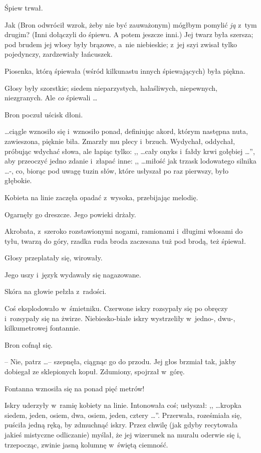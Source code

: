 \documentclass[oneside,polish,11pt,rmheadings]{mwbk}
\begin{document}
Śpiew trwał. 

Jak (Bron odwrócił wzrok, żeby nie być zauważonym) mógłbym pomylić \textit{ją } z~tym drugim? (Inni dołączyli do śpiewu. A potem jeszcze inni.) Jej twarz była szersza; pod brudem jej włosy były brązowe, a~nie niebieskie; z~jej szyi zwisał tylko pojedynczy, zardzewiały łańcuszek. 

Piosenka, którą śpiewała (wśród kilkunastu innych śpiewających) była piękna. 

Głosy były szorstkie; siedem nieparzystych, hałaśliwych, niepewnych, niezgranych. Ale \textit{co } śpiewali \ldots  

Bron poczuł uścisk dłoni. 

 \ldots  ciągle wznosiło się i~wznosiło ponad, definiując akord, którym następna nuta, zawieszona, pięknie biła. Zmarzły mu plecy i~brzuch. Wydychał, oddychał, próbując wdychać słowa, ale łapiąc tylko: ,, \ldots  cały onyks i~fałdy krwi gołębiej \ldots '', aby przeoczyć jedno zdanie i~złapać inne: ,, \ldots  miłość jak trzask lodowatego silnika  \ldots -, co, biorąc pod uwagę tuzin słów, które usłyszał po raz pierwszy, było głębokie. 

Kobieta na linie zaczęła opadać z~wysoka, przebijając melodię. 

Ogarnęły go dreszcze. Jego powieki drżały. 

Akrobata, z~szeroko rozstawionymi nogami, ramionami i~długimi włosami do tyłu, twarzą do góry, rzadka ruda broda zaczesana tuż pod brodą, też śpiewał. 

Głosy przeplatały się, wirowały. 

Jego uszy i~język wydawały się nagazowane. 

Skóra na głowie pełzła z~radości. 

Coś eksplodowało w~śmietniku. Czerwone iskry rozsypały się po obręczy i~rozsypały się na żwirze. Niebiesko-białe iskry wystrzeliły w~jedno-, dwu-, kilkumetrowej fontannie. 

Bron cofnął się. 

-- Nie, patrz \ldots  -- szepnęła, ciągnąc go do przodu. Jej głos brzmiał tak, jakby dobiegał ze sklepionych kopuł. Zdumiony, spojrzał w~górę. 

Fontanna wznosiła się na ponad pięć metrów! 

Iskry uderzyły w~ramię kobiety na linie. Intonowała coś; usłyszał: ,, \ldots  kropka siedem, jeden, osiem, dwa, osiem, jeden, cztery \ldots ''. Przerwała, roześmiała się, puściła jedną ręką, by zdmuchnąć iskry. Przez chwilę (jak gdyby recytowała jakieś mistyczne odliczanie) myślał, że jej wizerunek na muralu oderwie się i, trzepocząc, zwinie jasną kolumnę w~świętą ciemność. 
\end{document}
